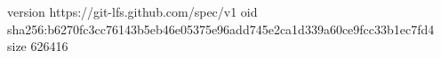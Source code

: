 version https://git-lfs.github.com/spec/v1
oid sha256:b6270fc3cc76143b5eb46e05375e96add745e2ca1d339a60ce9fcc33b1ec7fd4
size 626416
